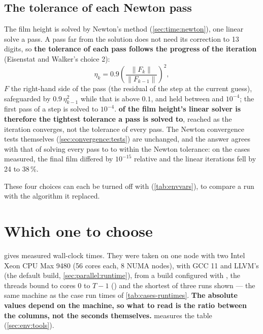 \subsection{The tolerance of each Newton pass}
\label{sec:linsolve:ew}

The film height is solved by Newton's method (\cref{sec:time:newton}), one
linear solve a pass. A pass far from the solution does not need its
correction to 13 digits, so \textbf{the tolerance of each pass follows the
progress of the iteration} (Eisenstat and Walker's choice 2):
\[
  \eta_k = 0.9\left(\frac{\lVert F_k\rVert}{\lVert F_{k-1}\rVert}\right)^{2},
\]
$F$ the right-hand side of the pass (the residual of the step at the current
guess), safeguarded by $0.9\,\eta_{k-1}^2$ while that is above $0.1$, and held
between  and $10^{-4}$; the first pass of a step is solved to
$10^{-4}$. \textbf{ of the film height's linear solver is
therefore the tightest tolerance a pass is solved to}, reached as the
iteration converges, not the tolerance of every pass. The Newton convergence
tests themselves (\cref{sec:convergence:tests}) are unchanged, and the
answer agrees with that of solving every pass to  to within
the Newton tolerance: on the cases measured, the final film differed by
$10^{-15}$ relative and the linear iterations fell by 24 to 38\,\%.

These four choices can each be turned off with 
(\cref{tab:envvars}), to compare a run with the algorithm it replaced.

\section{Which one to choose}
\label{sec:linsolve:choosing}

 gives measured wall-clock times. They were taken on
one node with two Intel Xeon CPU Max 9480 (56 cores each, 8 NUMA nodes), with
GCC 11 and LLVM's  (the default build, \cref{sec:parallel:runtime}),
from a  build configured with ,
the threads bound to cores 0 to $T-1$ () and the
shortest of three runs shown --- the same machine as the case run times of
\cref{tab:cases-runtimes}. \textbf{The absolute values depend on the machine,
so what to read is the ratio between the columns, not the seconds
themselves.}  measures the table
(\cref{sec:env:tools}).


